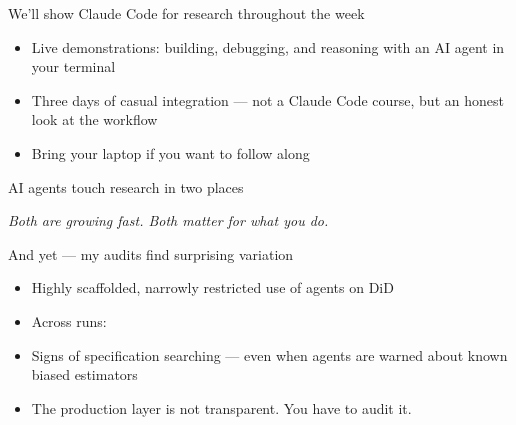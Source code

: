 \documentclass[aspectratio=169,11pt]{beamer}
\begin{document}
\begin{frame}{We'll show Claude Code for research throughout the week}
\vspace{0.5em}
\begin{itemize}
  \item Live demonstrations: building, debugging, and reasoning with an AI agent in your terminal
  \item Three days of casual integration --- not a Claude Code course, but an honest look at the workflow
  \item Bring your laptop if you want to follow along
\end{itemize}
\vspace{1em}
\end{frame}

\begin{frame}{AI agents touch research in two places}
\vspace{0.4em}
\begin{center}
\end{center}
\vspace{0.4em}
\begin{center}
\small\color{warmgray}\itshape Both are growing fast. Both matter for what you do.
\end{center}
\end{frame}

\begin{frame}{And yet --- my audits find surprising variation}
\vspace{0.5em}
\begin{itemize}
  \item Highly scaffolded, narrowly restricted use of agents on DiD
  \item Across runs: 
  \item Signs of specification searching --- even when agents are warned about known biased estimators
  \item The production layer is not transparent. You have to audit it.
\end{itemize}
\end{frame}
\end{document}
